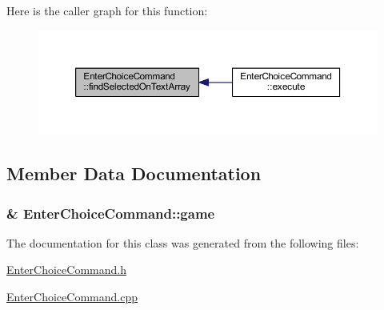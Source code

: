 Here is the caller graph for this function\+:\nopagebreak
\begin{figure}[H]
\begin{center}
\leavevmode
\includegraphics[width=350pt]{class_enter_choice_command_a09b35eafcb1ba6d9e6fb93425702e6c4_icgraph}
\end{center}
\end{figure}




\subsection{Member Data Documentation}
\hypertarget{class_enter_choice_command_a53c2b9d8c1ee8b9bdbed6ad4889f10b0}{}
\subsubsection[{game}]{\& Enter\+Choice\+Command\+::game\hspace{0.3cm}{\ttfamily [protected]}}\label{class_enter_choice_command_a53c2b9d8c1ee8b9bdbed6ad4889f10b0}


The documentation for this class was generated from the following files\+:\begin{DoxyCompactItemize}
\item 
\hyperlink{_enter_choice_command_8h}{Enter\+Choice\+Command.\+h}\item 
\hyperlink{_enter_choice_command_8cpp}{Enter\+Choice\+Command.\+cpp}\end{DoxyCompactItemize}
